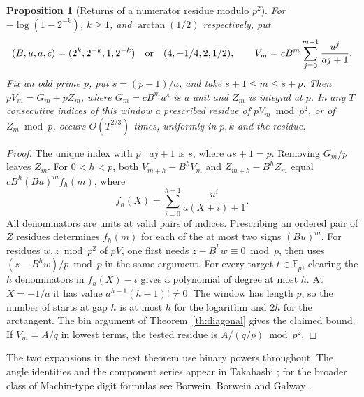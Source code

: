 \documentclass[11pt]{article}
\newtheorem{proposition}[theorem]{Proposition}
\newcommand{\F}{\mathbb F}
\begin{document}
\begin{proposition}[Returns of a numerator residue modulo $p^2$]\label{prop:twodigits}
For $-\log(1-2^{-k})$, $k\ge1$, and $\arctan(1/2)$ respectively, put
\[
 (B,u,a,c)=(2^k,2^{-k},1,2^{-k})\quad\hbox{or}\quad
 (4,-1/4,2,1/2),\qquad V_m=c B^m\sum_{j=0}^{m-1}\frac{u^j}{aj+1}.
\]
Fix an odd prime $p$, put $s=(p-1)/a$, and take $s+1\le m\le s+p$.
Then $pV_m=G_m+pZ_m$, where $G_m=c B^mu^s$ is a unit and $Z_m$ is integral
at $p$. In any $T$ consecutive indices of this window a prescribed residue
of $pV_m\bmod p^2$, or of $Z_m\bmod p$, occurs $O(T^{2/3})$ times,
uniformly in $p,k$ and the residue.
\end{proposition}
\begin{proof}
The unique index with $p\mid aj+1$ is $s$, where $as+1=p$. Removing
$G_m/p$ leaves $Z_m$. For $0<h<p$, both $V_{m+h}-B^hV_m$ and
$Z_{m+h}-B^hZ_m$ equal $c B^h(Bu)^m f_h(m)$, where
\[
 f_h(X)=\sum_{i=0}^{h-1}\frac{u^i}{a(X+i)+1}.
\]
All denominators are units at valid pairs of indices. Prescribing an ordered
pair of $Z$ residues determines $f_h(m)$ for each of the at most two signs
$(Bu)^m$. For residues $w,z\bmod p^2$ of $pV$, one first needs
$z-B^h w\equiv0\bmod p$, then uses $(z-B^h w)/p\bmod p$ in the same
argument. For every target $t\in\F_p$, clearing the $h$ denominators in
$f_h(X)-t$ gives a polynomial of degree at most $h$. At $X=-1/a$ it has
value $a^{h-1}(h-1)!\ne0$. The window has length $p$, so the number of starts
at gap $h$ is at most $h$ for the logarithm and $2h$ for the arctangent.
The bin argument of Theorem~\ref{th:diagonal} gives the claimed bound.
If $V_m=A/q$ in lowest terms, the tested residue is $A/(q/p)\bmod p^2$.
\end{proof}

The two expansions in the next theorem use binary powers throughout.
The angle identities and the component series appear in
Takahashi \cite[eqs.~(11)--(19)]{takahashi}; for the broader class of Machin-type digit formulas see Borwein, Borwein and Galway \cite{machin}.
\end{document}
